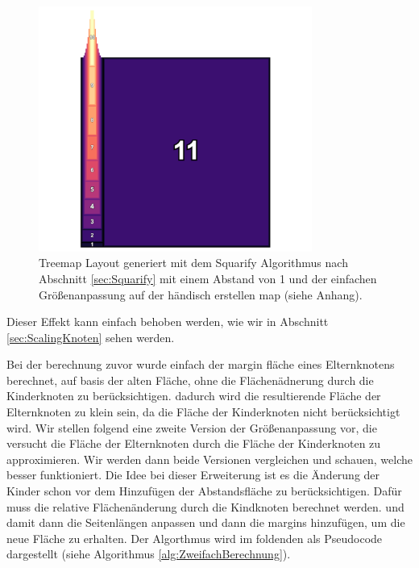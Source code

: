 \begin{figure}
    \centering
    \includegraphics[width=0.8\textwidth]{images/simpleIncreaseMarginOne.png}
    \caption{Treemap Layout generiert mit dem Squarify Algorithmus nach Abschnitt \ref{sec:Squarify} mit einem Abstand von 1 und der einfachen Größenanpassung auf der händisch erstellen map (siehe Anhang).}
    \label{fig:simpleIncreaseMarginOne}
\end{figure}

Dieser Effekt kann einfach behoben werden, wie wir in Abschnitt \ref{sec:ScalingKnoten} sehen werden.

Bei der berechnung zuvor wurde einfach der margin fläche eines Elternknotens berechnet, auf basis der alten Fläche, ohne die Flächenädnerung durch die Kinderknoten zu berücksichtigen. dadurch wird die resultierende Fläche der Elternknoten zu klein sein, da die Fläche der Kinderknoten nicht berücksichtigt wird.
Wir stellen folgend eine zweite Version der Größenanpassung vor, die versucht die Fläche der Elternknoten durch die Fläche der Kinderknoten zu approximieren. Wir werden dann beide Versionen vergleichen und schauen, welche besser funktioniert.
Die Idee bei dieser Erweiterung ist es die Änderung der Kinder schon vor dem Hinzufügen der Abstandsfläche zu berücksichtigen. Dafür muss die relative Flächenänderung durch die Kindknoten berechnet werden. und damit dann die Seitenlängen anpassen und dann die margins hinzufügen, um die neue Fläche zu erhalten.
Der Algorthmus wird im foldenden als Pseudocode dargestellt (siehe Algorithmus \ref{alg:ZweifachBerechnung}). 

